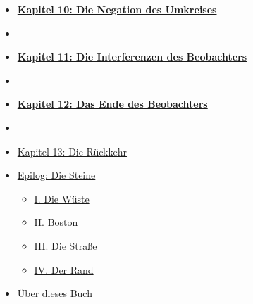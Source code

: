 \documentclass[
  ngerman,
]{article}
\providecommand{\tightlist}{%
  \setlength{\itemsep}{0pt}\setlength{\parskip}{0pt}}
\begin{document}
\begin{itemize}
{{  9: Die leere Seite}}
\item
  \protect{}\label{toc-kapitel-10-die-negation-des-umkreises}\hyperref[kapitel-10-die-negation-des-umkreises]{\textbf{Kapitel
  10: Die Negation des Umkreises}}
\item
  \protect{}\label{toc-section-4}\hyperref[section-4]{\hfill\break
  }
\item
  \protect{}\label{toc-kapitel-11-die-interferenzen-des-beobachters}\hyperref[kapitel-11-die-interferenzen-des-beobachters]{\textbf{Kapitel
  11: Die Interferenzen des Beobachters}}
\item
  \protect{}\label{toc-section-5}\hyperref[section-5]{\hfill\break
  }
\item
  \protect{}\label{toc-kapitel-12-das-ende-des-beobachters}\hyperref[kapitel-12-das-ende-des-beobachters]{\textbf{Kapitel
  12: Das Ende des Beobachters}}
\item
  \protect{}\label{toc-section-6}\hyperref[section-6]{\hfill\break
  }
\item
  \protect{}\label{toc-kapitel-13-die-ruxfcckkehr}\hyperref[kapitel-13-die-ruxfcckkehr]{Kapitel
  13: Die Rückkehr}
\item
  \protect{}\label{toc-epilog-die-steine}\hyperref[epilog-die-steine]{Epilog:
  Die Steine}

  \begin{itemize}
  \tightlist
  \item
    \protect{}\label{toc-i.-die-wuxfcste}\hyperref[i.-die-wuxfcste]{I.
    Die Wüste}
  \item
    \protect{}\label{toc-ii.-boston}\hyperref[ii.-boston]{II.
    Boston}
  \item
    \protect{}\label{toc-iii.-die-strauxdfe}\hyperref[iii.-die-strauxdfe]{III.
    Die Straße}
  \item
    \protect{}\label{toc-iv.-der-rand}\hyperref[iv.-der-rand]{IV.
    Der Rand}
  \end{itemize}
\item
  \protect{}\label{toc-uxfcber-dieses-buch}\hyperref[uxfcber-dieses-buch]{Über
  dieses Buch}


\end{itemize}
\end{document}
